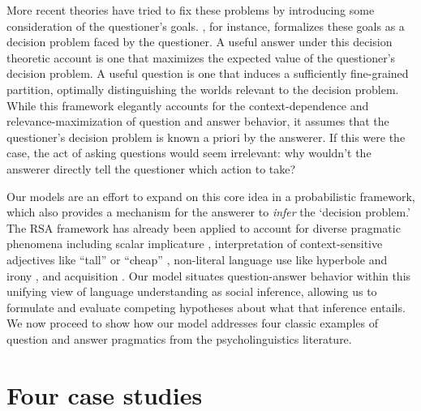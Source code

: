 \documentclass[12pt, floatsintext, jou]{apa6}
\begin{document}
More recent theories have tried to fix these problems by introducing some consideration of the questioner's goals. , for instance, formalizes these goals as a decision problem faced by the questioner. A useful answer under this decision theoretic account is one that maximizes the expected value of the questioner's decision problem. A useful question is one that induces a sufficiently fine-grained partition, optimally distinguishing the worlds relevant to the decision problem. While this framework elegantly accounts for the context-dependence and relevance-maximization of question and answer behavior, it assumes that the questioner's decision problem is known a priori by the answerer.  If this were the case, the act of asking questions would seem irrelevant: why wouldn't the answerer directly tell the questioner which action to take?

Our models are an effort to expand on this core idea in a probabilistic framework, which also provides a mechanism for the answerer to \emph{infer} the `decision problem.' The RSA framework has already been applied to account for diverse pragmatic phenomena including scalar implicature \cite{GoodmanStuhlmuller13_KnowledgeImplicature}, interpretation of context-sensitive adjectives like ``tall'' or ``cheap'' \cite{LassiterGoodman14_Adjectives}, non-literal language use like hyperbole \cite{KaoWuBergenGoodman14_NonliteralNumberWords} and irony \cite{KaoGoodman15_IronyCogSci}, and acquisition \cite{FrankGoodman14_InferringWordMeanings}. Our model situates question-answer behavior within this unifying view of language understanding as social inference, allowing us to formulate and evaluate competing hypotheses about what that inference entails. We now proceed to show how our model addresses four classic examples of question and answer pragmatics from the psycholinguistics literature.

\section{Four case studies}

\end{document}
